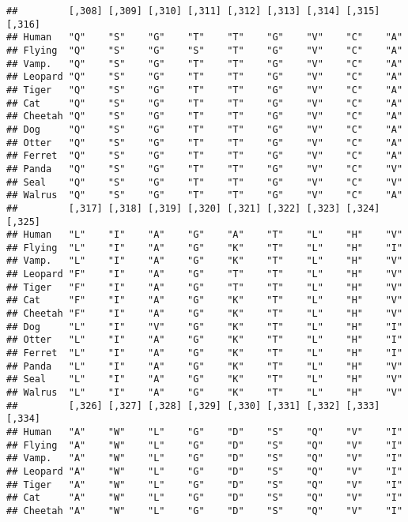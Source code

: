 \documentclass[]{article}
\begin{document}
\begin{verbatim}
##         [,308] [,309] [,310] [,311] [,312] [,313] [,314] [,315] [,316]
## Human   "Q"    "S"    "G"    "T"    "T"    "G"    "V"    "C"    "A"   
## Flying  "Q"    "S"    "G"    "S"    "T"    "G"    "V"    "C"    "A"   
## Vamp.   "Q"    "S"    "G"    "T"    "T"    "G"    "V"    "C"    "A"   
## Leopard "Q"    "S"    "G"    "T"    "T"    "G"    "V"    "C"    "A"   
## Tiger   "Q"    "S"    "G"    "T"    "T"    "G"    "V"    "C"    "A"   
## Cat     "Q"    "S"    "G"    "T"    "T"    "G"    "V"    "C"    "A"   
## Cheetah "Q"    "S"    "G"    "T"    "T"    "G"    "V"    "C"    "A"   
## Dog     "Q"    "S"    "G"    "T"    "T"    "G"    "V"    "C"    "A"   
## Otter   "Q"    "S"    "G"    "T"    "T"    "G"    "V"    "C"    "A"   
## Ferret  "Q"    "S"    "G"    "T"    "T"    "G"    "V"    "C"    "A"   
## Panda   "Q"    "S"    "G"    "T"    "T"    "G"    "V"    "C"    "V"   
## Seal    "Q"    "S"    "G"    "T"    "T"    "G"    "V"    "C"    "V"   
## Walrus  "Q"    "S"    "G"    "T"    "T"    "G"    "V"    "C"    "A"   
##         [,317] [,318] [,319] [,320] [,321] [,322] [,323] [,324] [,325]
## Human   "L"    "I"    "A"    "G"    "A"    "T"    "L"    "H"    "V"   
## Flying  "L"    "I"    "A"    "G"    "K"    "T"    "L"    "H"    "I"   
## Vamp.   "L"    "I"    "A"    "G"    "K"    "T"    "L"    "H"    "V"   
## Leopard "F"    "I"    "A"    "G"    "T"    "T"    "L"    "H"    "V"   
## Tiger   "F"    "I"    "A"    "G"    "T"    "T"    "L"    "H"    "V"   
## Cat     "F"    "I"    "A"    "G"    "K"    "T"    "L"    "H"    "V"   
## Cheetah "F"    "I"    "A"    "G"    "K"    "T"    "L"    "H"    "V"   
## Dog     "L"    "I"    "V"    "G"    "K"    "T"    "L"    "H"    "I"   
## Otter   "L"    "I"    "A"    "G"    "K"    "T"    "L"    "H"    "I"   
## Ferret  "L"    "I"    "A"    "G"    "K"    "T"    "L"    "H"    "I"   
## Panda   "L"    "I"    "A"    "G"    "K"    "T"    "L"    "H"    "V"   
## Seal    "L"    "I"    "A"    "G"    "K"    "T"    "L"    "H"    "V"   
## Walrus  "L"    "I"    "A"    "G"    "K"    "T"    "L"    "H"    "V"   
##         [,326] [,327] [,328] [,329] [,330] [,331] [,332] [,333] [,334]
## Human   "A"    "W"    "L"    "G"    "D"    "S"    "Q"    "V"    "I"   
## Flying  "A"    "W"    "L"    "G"    "D"    "S"    "Q"    "V"    "I"   
## Vamp.   "A"    "W"    "L"    "G"    "D"    "S"    "Q"    "V"    "I"   
## Leopard "A"    "W"    "L"    "G"    "D"    "S"    "Q"    "V"    "I"   
## Tiger   "A"    "W"    "L"    "G"    "D"    "S"    "Q"    "V"    "I"   
## Cat     "A"    "W"    "L"    "G"    "D"    "S"    "Q"    "V"    "I"   
## Cheetah "A"    "W"    "L"    "G"    "D"    "S"    "Q"    "V"    "I"   

\end{verbatim}
\end{document}
